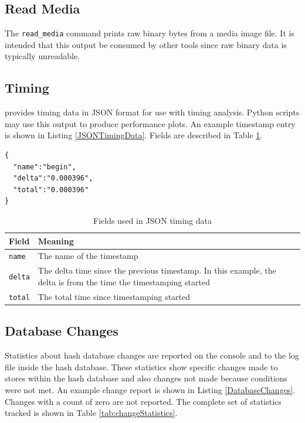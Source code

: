 \documentclass[11pt,fleqn]{article} %
\begin{document}
\subsection{Read Media}
The \verb+read_media+ command prints raw binary bytes from a media image file. It is intended that this output be consumed by other tools since raw binary data is typically unreadable.\\

\subsection{Timing}
\hdb provides timing data in JSON format for use with timing analysis. Python scripts may use this output to produce performance plots. An example timestamp entry is shown in Listing \ref{JSONTimingData}. Fields are described in Table \ref{tab:JSONTimingData}.\\

\lstset{style=customfile}
\begin{lstlisting}[float, caption={Example JSON timestamp format}, label=JSONTimingData]
{
  "name":"begin",
  "delta":"0.000396",
  "total":"0.000396"
}
\end{lstlisting}

\begin{table}[!ht]

\centering
\caption{Fields used in JSON timing data}
\label{tab:JSONTimingData}
\begin{tabular}{|p{5 cm}|p{8.8 cm}|}
\hline \hline
\textbf{Field} & \textbf{Meaning} \\
\hline
\verb+name+ & The name of the timestamp\\
\hline
\verb+delta+ & The delta time since the previous timestamp. In this example, the delta is from the time the timestamping started\\
\hline
\verb+total+ & The total time since timestamping started\\
\hline
\end{tabular}
\end{table}

\subsection{Database Changes}
Statistics about hash database changes are reported on the console and to the log file inside the hash database. These statistics show specific changes made to stores within the hash database and also changes not made because conditions were not met. An example change report is shown in Listing \ref{DatabaseChanges}. Changes with a count of zero are not reported. The complete set of statistics tracked is shown in Table \ref{tab:changeStatistics}.
\end{document}
